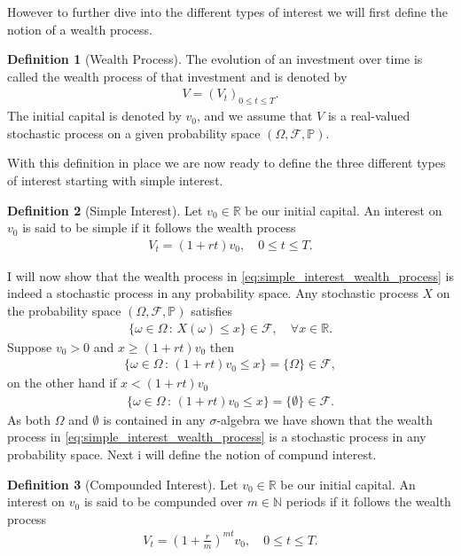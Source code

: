 \documentclass{article}
\theoremstyle{definition}
\newtheorem{definition}{Definition}[section]
\numberwithin{equation}{section}
\begin{document}
However to further dive into the different types of interest we will first define the notion of a wealth process.
\begin{definition}[Wealth Process]
    The evolution of an investment over time is called the wealth process of that investment and is denoted by
    \begin{align}
        V = (V_t)_{0 \leq t \leq T}.
    \end{align}
    The initial capital is denoted by $v_0$, and we assume that $V$ is a real-valued stochastic process on a given probability space $(\Omega, \mathcal{F}, \mathbb{P})$.
\end{definition}
With this definition in place we are now ready to define the three different types of interest starting with simple interest.
\begin{definition}[Simple Interest]
    Let $v_0 \in \mathbb{R}$ be our initial capital.
    An interest on $v_0$ is said to be simple if it follows the wealth process
    \begin{align}\label{eq:simple_interest_wealth_process}
        V_t = (1 + rt)v_0, \quad 0 \leq t \leq T.
    \end{align}
\end{definition}
I will now show that the wealth process in \eqref{eq:simple_interest_wealth_process} is indeed a stochastic process in any probability space.
Any stochastic process $X$ on the probability space $(\Omega, \mathcal{F}, \mathbb{P})$ satisfies
\begin{align}
    \{\omega \in \Omega \, : \, X(\omega) \leq x\} \in \mathcal{F}, \quad \forall x \in \mathbb{R}.
\end{align}
Suppose $v_0 > 0$ and $x \geq (1 + rt)v_0$ then
\begin{align}
    \{\omega \in \Omega \, : \, (1 + rt)v_0 \leq x\} = \{\Omega\} \in \mathcal{F},
\end{align}
on the other hand if $x < (1 + rt)v_0$
\begin{align}
    \{\omega \in \Omega \, : \, (1 + rt)v_0 \leq x\} = \{\emptyset\} \in \mathcal{F}.
\end{align}
As both $\Omega$ and $\emptyset$ is contained in any $\sigma$-algebra we have shown that the wealth process in \eqref{eq:simple_interest_wealth_process} is a stochastic process in any probability space.
Next i will define the notion of compund interest.
\begin{definition}[Compounded Interest]
    Let $v_0 \in \mathbb{R}$ be our initial capital.
    An interest on $v_0$ is said to be compunded over $m\in\mathbb{N}$ periods if it follows the wealth process
    \begin{align}\label{eq:compund_interest_wealth_process}
        V_t = \left( 1 + \frac{r}{m} \right)^{mt} v_0, \quad 0 \leq t \leq T.
    \end{align}
\end{definition}
\end{document}
